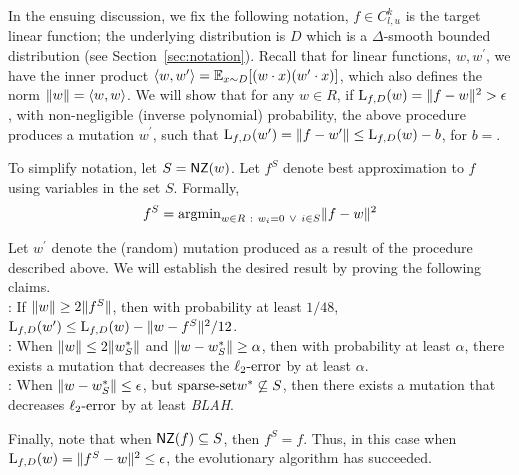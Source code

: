 In the ensuing discussion, we fix the following notation, $f \in C^k_{l, u}$ is
the target linear function; the underlying distribution is $D$ which is a
$\Delta$-smooth bounded distribution (see Section~\ref{sec:notation}). Recall
that for linear functions, $w, w^\prime$, we have the inner product
$\langle w, w^\prime \rangle = \mathbb{E}_{x \sim D}[(w \cdot x) (w^\prime \cdot x)]$, which also
defines the norm $\Vert w \Vert = \langle w, w \rangle$.  We will show that for any $w \in
R$, if $\mathrm{L}_{f, D}(w) = \Vert f - w \Vert^2 > \epsilon$, with non-negligible
(inverse polynomial) probability, the above procedure produces a mutation
$w^\prime$, such that $\mathrm{L}_{f, D}(w^\prime) = \Vert f - w^\prime \Vert \leq
\mathrm{L}_{f, D}(w) - b$, for $b = $.

To simplify notation, let $S = \mathsf{NZ}(w)$. Let $f^S$ denote best approximation to
$f$ using variables in the set $S$. Formally, 
\[ 
f^S = \mathrm{argmin}_{w \in R ~:~	w_i = 0 ~\vee~ i \in S} \Vert f- w \Vert^2
\]

Let $w^\prime$ denote the (random) mutation produced as a result of the
procedure described above.  We will establish the desired result by proving the
following claims. \smallskip \\
:  If $\Vert w \Vert \geq 2 \Vert f^S \Vert$, then with
probability at least $1/48$, $\mathrm{L}_{f, D}(w^\prime) \leq \mathrm{L}_{f, D}(w) -
\Vert w - f^S \Vert^2/12$. \medskip \\
: When $\Vert w \Vert \leq 2 \Vert w^*_S \Vert$ and
$\Vert w - w^*_S \Vert \geq \alpha$, then with probability at least $\alpha$,
there exists a mutation that decreases the $\mathrm{\ell_2\mbox{-}error}$ by at least $\alpha$.  \medskip  \\
: When $\Vert w - w^*_S \Vert \leq \epsilon$, but
$\mathrm{sparse\mbox{-}set}{w^*} \not\subseteq S$, then there exists a mutation that decreases
$\mathrm{\ell_2\mbox{-}error}$ by at least \emph{BLAH}. \medskip 

Finally, note that when $\mathsf{NZ}(f) \subseteq S$, then $f^S = f$. Thus, in this case
when $\mathrm{L}_{f, D}(w) = \Vert f^S - w \Vert^2 \leq \epsilon$, the evolutionary
algorithm has succeeded. \medskip 

